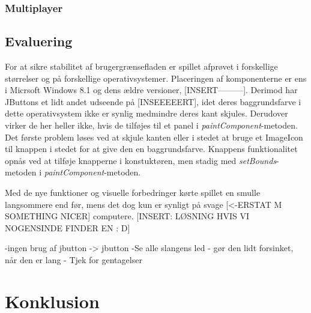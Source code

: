\documentclass{report}
\begin{document}
\subsection{Multiplayer}

\section{Evaluering}
For at sikre stabilitet af brugergrænsefladen er spillet afprøvet i forskellige størrelser og på forskellige operativsystemer. Placeringen af komponenterne er ens i Micrsoft Windows 8.1 og dens ældre versioner, [INSERT---------]. Derimod har JButtons et lidt andet udseende på [INSEEEEERT], idet deres baggrundsfarve i dette operativsystem ikke er synlig medmindre deres kant skjules. Derudover virker de her heller ikke, hvis de tilføjes til et panel i \textit{paintComponent}-metoden. Det første problem løses ved at skjule kanten eller i stedet at bruge et ImageIcon til knappen i stedet for at give den en baggrundsfarve. Knappens funktionalitet opnås ved at tilføje knapperne i konstuktøren, men stadig med \textit{setBounds}-metoden i \textit{paintComponent}-metoden. 

Med de nye funktioner og visuelle forbedringer kørte spillet en smulle langsommere end før, mens det dog kun er synligt på svage [<-ERSTAT M SOMETHING NICER] computere. [INSERT: LØSNING HVIS VI NOGENSINDE FINDER EN : D]

-ingen brug af jbutton -> jbutton
-Se alle slangens led - gør den lidt forsinket, når den er lang
- Tjek for gentagelser



\chapter{Konklusion}
\end{document}
